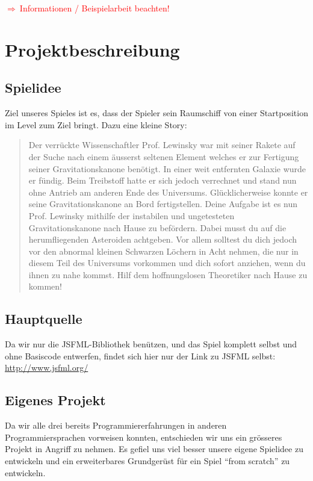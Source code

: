 \documentclass[12pt,a4paper]{scrartcl}
\newcommand{\q}[1]{``#1''}
\newcommand{\todo}[1]{\begin{Large}\textcolor{red}{$\Rightarrow ~$#1}\end{Large}}
\begin{document}


\clearpage

\tableofcontents

\clearpage

\todo{Informationen / Beispielarbeit beachten!}

\section{Projektbeschreibung}
\subsection{Spielidee}
Ziel unseres Spieles ist es, dass der Spieler sein Raumschiff von einer Startposition im Level
zum Ziel bringt. Dazu eine kleine Story:
\begin{quote}
Der verrückte Wissenschaftler Prof. Lewinsky war mit seiner Rakete auf der Suche nach einem äusserst seltenen Element welches er zur Fertigung seiner Gravitationskanone benötigt. 
In einer weit entfernten Galaxie wurde er fündig. 
Beim Treibstoff hatte er sich jedoch verrechnet und stand nun ohne Antrieb am anderen Ende des Universums.
Glücklicherweise konnte er seine Gravitationskanone an Bord fertigstellen.
Deine Aufgabe ist es nun Prof. Lewinsky mithilfe der instabilen und ungetesteten Gravitationskanone nach Hause zu befördern. 
Dabei musst du auf die herumfliegenden Asteroiden achtgeben. 
Vor allem solltest du dich jedoch vor den abnormal kleinen Schwarzen Löchern in Acht nehmen, die nur in diesem Teil des Universums vorkommen und dich sofort anziehen, wenn du ihnen zu nahe kommst. 
Hilf dem hoffnungslosen Theoretiker nach Hause zu kommen!
\end{quote}

\subsection{Hauptquelle}
Da wir nur die JSFML-Bibliothek benützen, und das Spiel komplett selbst und ohne Basiscode entwerfen, findet sich hier nur der Link 
zu JSFML selbst: \url{http://www.jsfml.org/}

\subsection{Eigenes Projekt}
Da wir alle drei bereits Programmiererfahrungen in anderen Programmiersprachen vorweisen konnten, entschieden wir uns ein grösseres Projekt
in Angriff zu nehmen. Es gefiel uns viel besser unsere eigene Spielidee zu entwickeln und ein erweiterbares Grundgerüst für ein Spiel \q{from scratch}
zu entwickeln.
\end{document}
